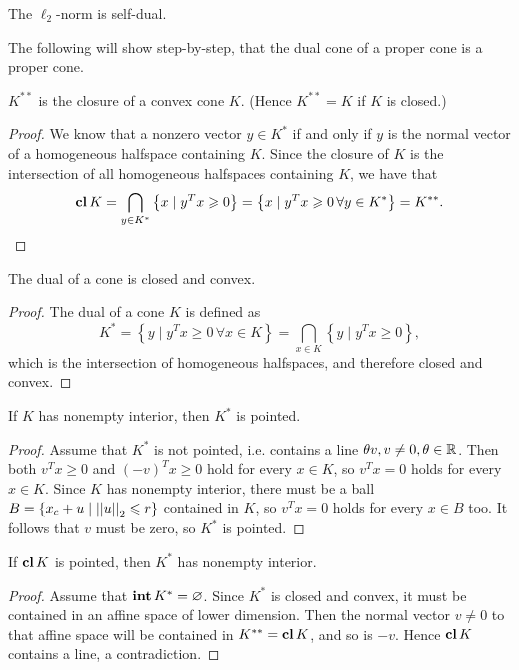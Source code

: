\documentclass[12pt]{article}
\begin{document}
\begin{corollary}
    The \(\ell_2\)-norm is self-dual.
\end{corollary}

The following will show step-by-step, that the dual cone of a proper cone is a proper cone.

\begin{proposition}
    \(K^{\ast\ast}\) is the closure of a convex cone \(K\). (Hence \(K^{\ast\ast}=K\) if \(K\) is closed.)
\end{proposition}
\begin{proof}
    We know that a nonzero vector \(y\in K^\ast\) if and only if \(y\) is the normal vector of a homogeneous halfspace containing \(K\). Since the closure of \(K\) is the intersection of all homogeneous halfspaces containing \(K\), we have that
    \[\operatorname{\mathbf{cl}} K=\bigcap_{y\in K^\ast}\left\{x\mid y^Tx\geqslant 0\right\}=\left\{x\mid y^Tx\geqslant 0\,\forall y\in K^\ast\right\}=K^{\ast\ast}.\]
\end{proof}

\begin{proposition}
    The dual of a cone is closed and convex.
\end{proposition}
\begin{proof}
    The dual of a cone \(K\) is defined as
    \[K^\ast=\left\{y\mid y^Tx\geqslant 0\,\forall x\in K\right\}=\bigcap_{x\in K}\left\{y\mid y^Tx\geqslant 0\right\},\]
    which is the intersection of homogeneous halfspaces, and therefore closed and convex.
\end{proof}

\begin{proposition}
    If \(K\) has nonempty interior, then \(K^\ast\) is pointed.
\end{proposition}
\begin{proof}
    Assume that \(K^\ast\) is not pointed, i.e. contains a line \(\theta v,v\neq 0,\theta\in\mathbb R\). Then both \(v^Tx\geqslant 0\) and \((-v)^Tx\geqslant 0\) hold for every \(x\in K\), so \(v^Tx=0\) holds for every \(x\in K\). Since \(K\) has nonempty interior, there must be a ball \(B=\{x_c+u\mid\left|\left|u\right|\right|_2\leqslant r\}\) contained in \(K\), so \(v^Tx=0\) holds for every \(x\in B\) too. It follows that \(v\) must be zero, so \(K^\ast\) is pointed.
\end{proof}

\begin{proposition}
    If \(\operatorname{\mathbf{cl}} K\) is pointed, then \(K^\ast\) has nonempty interior.
\end{proposition}
\begin{proof}
    Assume that \(\operatorname{\mathbf{int}} K^\ast=\varnothing\). Since \(K^\ast\) is closed and convex, it must be contained in an affine space of lower dimension. Then the normal vector \(v\neq 0\) to that affine space will be contained in \(K^{\ast\ast}=\operatorname{\mathbf{cl}} K\), and so is \(-v\). Hence \(\operatorname{\mathbf{cl}} K\) contains a line, a contradiction.
\end{proof}
\end{document}

